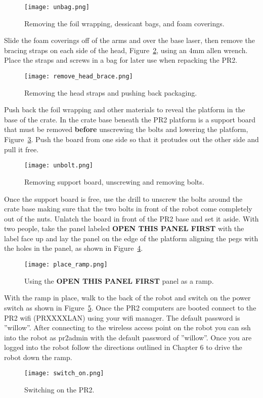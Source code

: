 \begin{figure}[h]
\centering
\texttt{[image: unbag.png]}
\caption{Removing the foil wrapping, dessicant bags, and foam coverings.}
\label{fig:unbagPR2}
\end{figure}

Slide the foam coverings off of the arms and over the base laser, then remove
the bracing straps on each side of the head, Figure~\ref{fig:head_straps}, using
an 4mm allen wrench. Place the straps and screws in a bag for later use when
repacking the PR2.

\begin{figure}[h]
\centering
\texttt{[image: remove\_head\_brace.png]}
\caption{Removing the head straps and pushing back packaging.}
\label{fig:head_straps}
\end{figure}

Push back the foil wrapping and other materials to reveal the platform in the
base of the crate. In the crate base beneath the PR2 platform is a support board
that must be removed {\bf before} unscrewing the bolts and lowering the platform, 
Figure~\ref{fig:unbolt}. Push the board from one side so that it protudes out the 
other side and pull it free. 

\begin{figure}[h]
\centering
\texttt{[image: unbolt.png]}
\caption{Removing support board, unscrewing and removing bolts.}
\label{fig:unbolt}
\end{figure}

Once the support board is free, use the drill to unscrew the bolts around
the crate base making sure that the two bolts in front of the robot come
completely out of the nuts. Unlatch the board in front of the PR2 base and set
it aside. With two people, take the panel labeled {\bf OPEN THIS PANEL FIRST} with
the label face up and lay the panel on the edge of the platform aligning the pegs
with the holes in the panel, as shown in Figure~\ref{fig:place_ramp}.

\begin{figure}[h]
\centering
\texttt{[image: place\_ramp.png]}
\caption{Using the {\bf OPEN THIS PANEL FIRST} panel as a ramp.}
\label{fig:place_ramp}
\end{figure}

With the ramp in place, walk to the back of the robot and switch on the power switch
as shown in Figure~\ref{fig:switch_on}. Once the PR2 computers are booted connect 
to the PR2 wifi (PRXXXXLAN) using your wifi manager. The default password is ''willow''. 
After connecting to the wireless access point on the robot you can ssh into the robot 
as pr2admin with the default password of ''willow''. Once you are logged into the robot 
follow the directions outlined in Chapter 6 to drive the robot down the ramp. 

\begin{figure}[h]
\centering
\texttt{[image: switch\_on.png]}
\caption{Switching on the PR2.}
\label{fig:switch_on}
\end{figure}

